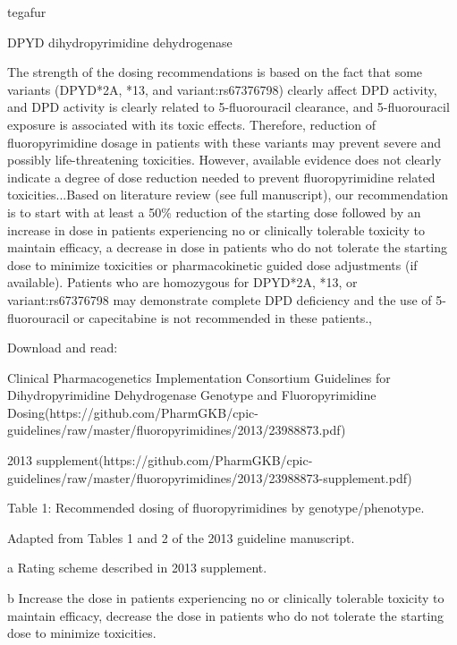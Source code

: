 \documentclass{resume} %
\begin{document}
\begin{rSection}{ tegafur }
\begin{rSubsection}{ DPYD }{ dihydropyrimidine dehydrogenase }{}{}
\item The strength of the dosing recommendations is based on the fact that some variants (DPYD*2A, *13, and variant:rs67376798) clearly affect DPD activity, and DPD activity is clearly related to 5-fluorouracil clearance, and 5-fluorouracil exposure is associated with its toxic effects. Therefore, reduction of fluoropyrimidine dosage in patients with these variants may prevent severe and possibly life-threatening toxicities. However, available evidence does not clearly indicate a degree of dose reduction needed to prevent fluoropyrimidine related toxicities...Based on literature review (see full manuscript), our recommendation is to start with at least a 50\% reduction of the starting dose followed by an increase in dose in patients experiencing no or clinically tolerable toxicity to maintain efficacy, a decrease in dose in patients who do not tolerate the starting dose to minimize toxicities or pharmacokinetic guided dose adjustments (if available). Patients who are homozygous for DPYD*2A, *13, or variant:rs67376798 may demonstrate complete DPD deficiency and the use of 5-fluorouracil or capecitabine is not recommended in these patients.,  
 \newline
\item Download and read:
 \newline
\item Clinical Pharmacogenetics Implementation Consortium Guidelines for Dihydropyrimidine Dehydrogenase Genotype and Fluoropyrimidine Dosing(https://github.com/PharmGKB/cpic-guidelines/raw/master/fluoropyrimidines/2013/23988873.pdf)
 \newline
\item 2013 supplement(https://github.com/PharmGKB/cpic-guidelines/raw/master/fluoropyrimidines/2013/23988873-supplement.pdf)
 \newline
\item Table 1: Recommended dosing of fluoropyrimidines by genotype/phenotype.
 \newline
\item Adapted from Tables 1 and 2 of the 2013 guideline manuscript.
 \newline
\item a Rating scheme described in 2013 supplement.
 \newline
\item b Increase the dose in patients experiencing no or clinically tolerable toxicity to maintain efficacy,  decrease the dose in patients who do not tolerate the starting dose to minimize toxicities.

\end{rSubsection}
\end{rSection}
\end{document}
